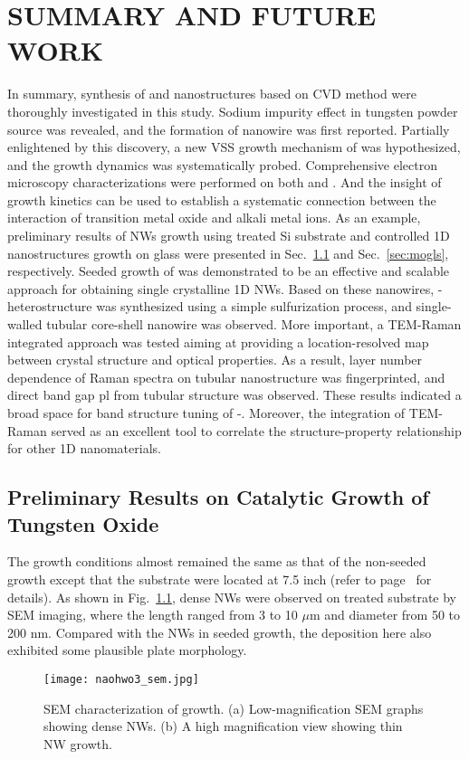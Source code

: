\chapter{SUMMARY AND FUTURE WORK}

In summary, synthesis of  and  nanostructures based on CVD method were thoroughly investigated in this study. Sodium impurity effect in tungsten powder source was revealed, and the formation of  nanowire was first reported. Partially enlightened by this discovery, a new VSS growth mechanism of  was hypothesized, and the growth dynamics was systematically probed. Comprehensive electron microscopy characterizations were performed on both  and . And the insight of growth kinetics can be used to establish a systematic connection between the interaction of transition metal oxide and alkali metal ions. As an example, preliminary results of  NWs growth using  treated Si substrate and controlled  1D nanostructures growth on glass were presented in Sec.~\ref{sec:nawo} and Sec.~\ref{sec:mogls}, respectively. Seeded growth of  was demonstrated to be an effective and scalable approach for obtaining single crystalline 1D  NWs. Based on these  nanowires, - heterostructure was synthesized using a simple sulfurization process, and single-walled  tubular core-shell nanowire was observed. More important, a TEM-Raman integrated approach was tested aiming at providing a location-resolved map between crystal structure and optical properties. As a result, layer number dependence of Raman spectra on  tubular nanostructure was fingerprinted, and direct band gap \gls{pl} from  tubular structure was observed. These results indicated a broad space for band structure tuning of -. Moreover, the integration of TEM-Raman served as an excellent tool to correlate the structure-property relationship for other 1D nanomaterials.

\section{Preliminary Results on Catalytic Growth of Tungsten Oxide}\label{sec:nawo}
The growth conditions almost remained the same as that of the non-seeded  growth except that the substrate were located at 7.5 inch (refer to page~\pageref{sec:woxnonseed} for details). As shown in Fig.~\ref{fig:naohwsem}, dense NWs were observed on  treated substrate by SEM imaging, where the length ranged from 3 to 10 $\mu$m and diameter from 50 to 200 nm. Compared with the  NWs in seeded growth, the deposition here also exhibited some plausible plate morphology.
\begin{figure}[htb]
\centering
\texttt{[image: naohwo3\_sem.jpg]}
\caption[SEM characterization of   growth]{SEM characterization of   growth. (a) Low-magnification SEM graphs showing dense  NWs. (b) A high magnification view showing thin NW growth.}
\label{fig:naohwsem}
\end{figure}

